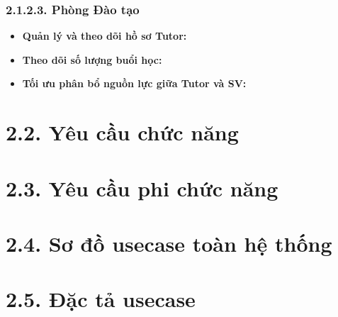 
\subsubsection*{2.1.2.3. Phòng Đào tạo}
\begin{itemize}
    \item \textbf{Quản lý và theo dõi hồ sơ Tutor:}
    \item \textbf{Theo dõi số lượng buổi học:}
    \item \textbf{Tối ưu phân bổ nguồn lực giữa Tutor và SV:}
\end{itemize}



\section*{2.2. Yêu cầu chức năng}



\section*{2.3. Yêu cầu phi chức năng}



\section*{2.4. Sơ đồ usecase toàn hệ thống}



\section*{2.5. Đặc tả usecase}
